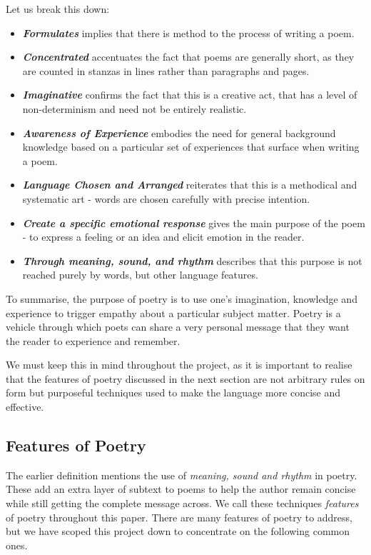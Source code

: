 Let us break this down:
\begin{itemize}
\item{\textit{\textbf{Formulates}} implies that there is method to the process of writing a poem.}
\item{\textit{\textbf{Concentrated}} accentuates the fact that poems are generally short, as they are counted in stanzas in lines rather than paragraphs and pages.}
\item{\textit{\textbf{Imaginative}} confirms the fact that this is a creative act, that has a level of non-determinism and need not be entirely realistic.}
\item{\textit{\textbf{Awareness of Experience}} embodies the need for general background knowledge based on a particular set of experiences that surface when writing a poem.}
\item{\textit{\textbf{Language Chosen and Arranged}} reiterates that this is a methodical and systematic art - words are chosen carefully with precise intention.}
\item{\textit{\textbf{Create a specific emotional response}} gives the main purpose of the poem - to express a feeling or an idea and elicit emotion in the reader.}
\item{\textit{\textbf{Through meaning, sound, and rhythm}} describes that this purpose is not reached purely by words, but other language features.}
\end{itemize}

To summarise, the purpose of poetry is to use one's imagination, knowledge and experience to trigger empathy about a particular subject matter. Poetry is a vehicle through which poets can share a very personal message that they want the reader to experience and remember. 

We must keep this in mind throughout the project, as it is important to realise that the features of poetry discussed in the next section are not arbitrary rules on form but purposeful techniques used to make the language more concise and effective.

\subsection{Features of Poetry}
\label{sec:features}

The earlier definition mentions the use of \textit{meaning, sound and rhythm} in poetry. These add an extra layer of subtext to poems to help the author remain concise while still getting the complete message across. We call these techniques \textit{features} of poetry throughout this paper. There are many features of poetry to address, but we have scoped this project down to concentrate on the following common ones.

